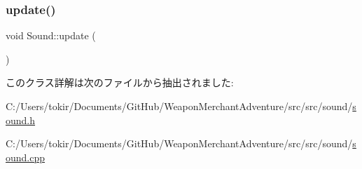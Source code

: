 \mbox{\label{class_sound_a1363950fc24a88df0c358f453843b80c}} 
\subsubsection{\texorpdfstring{update()}{update()}}
{\footnotesize\ttfamily void Sound\+::update (\begin{DoxyParamCaption}{ }\end{DoxyParamCaption})}



このクラス詳解は次のファイルから抽出されました\+:\begin{DoxyCompactItemize}
\item 
C\+:/\+Users/tokir/\+Documents/\+Git\+Hub/\+Weapon\+Merchant\+Adventure/src/src/sound/\mbox{\hyperlink{sound_8h}{sound.\+h}}\item 
C\+:/\+Users/tokir/\+Documents/\+Git\+Hub/\+Weapon\+Merchant\+Adventure/src/src/sound/\mbox{\hyperlink{sound_8cpp}{sound.\+cpp}}\end{DoxyCompactItemize}
